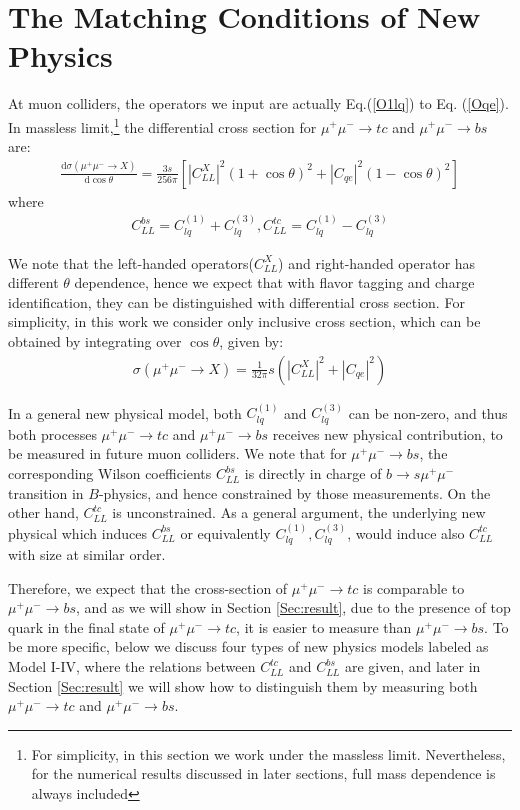 \documentclass[a4paper,11pt]{article}
\newcommand{\ud}{\mathrm{d}}
\begin{document}
\section{The Matching Conditions of New Physics}
\label{Sec:NP}

At muon colliders, the operators we input are actually Eq.(\ref{O1lq}) to Eq. (\ref{Oqe}).
 In massless limit,\footnote{For simplicity, in this section we work under the massless limit. Nevertheless, for the numerical results discussed in later sections, full mass dependence is always included} the differential cross section for $\mu^+\mu^-\to tc$ and  $\mu^+\mu^-\to bs$ are:
 \begin{align}
     \frac{\ud\sigma(\mu^+\mu^-\to X)}{\ud\cos\theta}=\frac{3s}{256\pi}\left[|C_{LL}^{X}|^2(1+\cos\theta)^2+|C_{qe}|^2(1-\cos\theta)^2\right]
 \end{align}
 where
 \begin{align}
 C_{LL}^{bs}=C_{lq}^{(1)}+C_{lq}^{(3)},C_{LL}^{tc}=C_{lq}^{(1)}-C_{lq}^{(3)}
 \end{align}

We note that the left-handed operators($C_{LL}^{X}$) and right-handed operator has different $\theta$ dependence, hence we expect that with flavor tagging and charge identification, they can be distinguished with differential cross section.
For simplicity, in this work we consider only inclusive cross section, which can be obtained by integrating over $\cos\theta$, given by:
\begin{align}
    \sigma(\mu^+\mu^-\to X)=\frac{1}{32\pi}s(|C_{LL}^{X}|^2+|C_{qe}|^2)
\end{align}

In a general new physical model,
both $C_{lq}^{(1)}$ and $C_{lq}^{(3)}$ can be non-zero,
and thus both processes $\mu^+\mu^-\to tc$ and $\mu^+\mu^-\to bs$ receives new physical contribution,
to be measured in future muon colliders.
We note that for $\mu^+\mu^-\to bs$, the corresponding Wilson coefficients $C_{LL}^{bs}$ is directly in charge of $b\to s\mu^+\mu^-$ transition in $B$-physics,
and hence constrained by those measurements.
On the other hand, $C_{LL}^{tc}$ is unconstrained.
As a general argument, the underlying new physical which induces $C_{LL}^{bs}$ or equivalently $C_{lq}^{(1)},C_{lq}^{(3)}$,
would induce also $C_{LL}^{tc}$ with size at similar order.

Therefore, we expect that the cross-section of $\mu^+\mu^-\to tc$ is comparable to $\mu^+\mu^-\to bs$,
and as we will show in Section \ref{Sec:result}, due to the presence of top quark in the final state of $\mu^+\mu^-\to tc$,
it is easier to measure than $\mu^+\mu^-\to bs$.
To be more specific, below we discuss four types of new physics models labeled as Model I-IV, 
where the relations between $C_{LL}^{tc}$ and $C_{LL}^{bs}$ are given,
and later in Section \ref{Sec:result} we will show how to distinguish them by measuring both $\mu^+\mu^-\to tc$ and $\mu^+\mu^-\to bs$.
\end{document}
